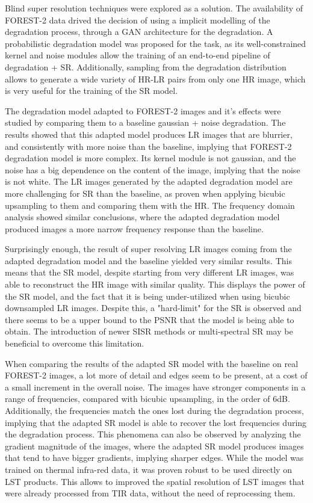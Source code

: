 Blind super resolution techniques were explored as a solution. The availability of FOREST-2 data drived the decision of using a implicit modelling of the degradation process, through a GAN architecture for the degradation. A probabilistic degradation model was proposed for the task, as its well-constrained kernel and noise modules allow the training of an end-to-end pipeline of degradation + SR. Additionally, sampling from the degradation distribution allows to generate a wide variety of HR-LR pairs from only one HR image, which is very useful for the training of the SR model.

The degradation model adapted to FOREST-2 images and it's effects were studied by comparing them to a baseline gaussian + noise degradation. The results showed that this adapted model produces LR images that are blurrier, and consistently with more noise than the baseline, implying that FOREST-2 degradation model is more complex.
Its kernel module is not gaussian, and the noise has a big dependence on the content of the image, implying that the noise is not white. 
The LR images generated by the adapted degradation model are more challenging for SR than the baseline, as proven when applying bicubic upsampling to them and comparing them with the HR.  
The frequency domain analysis showed similar conclusions, where the adapted degradation model produced images a more narrow frequency response than the baseline.

Surprisingly enough, the result of super resolving LR images coming from the adapted degradation model and the baseline yielded very similar results. This means that the SR model, despite starting from very different LR images, was able to reconstruct the HR image with similar quality. This displays the power of the SR model, and the fact that it is being under-utilized when using bicubic downsampled LR images. Despite this, a "hard-limit" for the SR is observed and there seems to be a upper bound to the PSNR that the model is being able to obtain. The introduction of newer SISR methods or multi-spectral SR may be beneficial to overcome this limitation.

When comparing the results of the adapted SR model with the baseline on real FOREST-2 images, a lot more of detail and edges seem to be present, at a cost of a small increment in the overall noise. 
The images have stronger components in a range of frequencies, compared with bicubic upsampling, in the order of 6dB. Additionally, the frequencies match the ones lost during the degradation process, implying that the adapted SR model is able to recover the lost frequencies during the degradation process.
This phenomena can also be observed by analyzing the gradient magnitude of the images, where the adapted SR model produces images that tend to have bigger gradients, implying sharper edges. 
While the model was trained on thermal infra-red data, it was proven robust to be used directly on LST products. This allows to improved the spatial resolution of LST images that were already processed from TIR data, without the need of reprocessing them.

